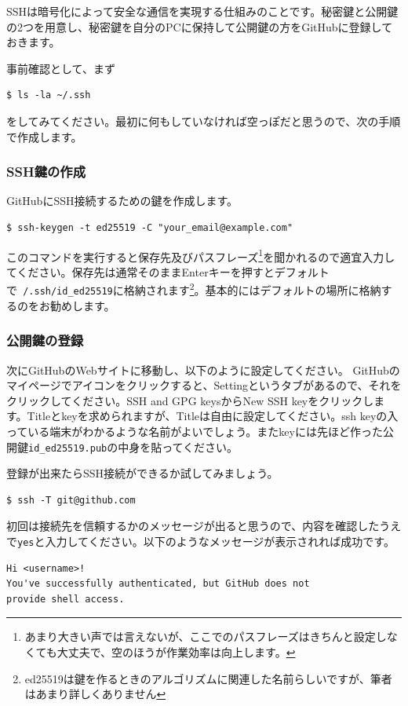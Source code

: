 \documentclass[12pt]{jreport}
\begin{document}
SSHは暗号化によって安全な通信を実現する仕組みのことです。秘密鍵と公開鍵の2つを用意し、秘密鍵を自分のPCに保持して公開鍵の方をGitHubに登録しておきます。

事前確認として、まず
\begin{lstlisting}[style=terminal]
    $ ls -la ~/.ssh
\end{lstlisting}
をしてみてください。最初に何もしていなければ空っぽだと思うので、次の手順で作成します。

\subsubsection{SSH鍵の作成}
GitHubにSSH接続するための鍵を作成します。
\begin{lstlisting}[style=terminal]
    $ ssh-keygen -t ed25519 -C "your_email@example.com"
\end{lstlisting}
このコマンドを実行すると保存先及びパスフレーズ\footnote{あまり大きい声では言えないが、ここでのパスフレーズはきちんと設定しなくても大丈夫で、空のほうが作業効率は向上します。}を聞かれるので適宜入力してください。保存先は通常そのままEnterキーを押すとデフォルトで\texttt{~/.ssh/id_ed25519}に格納されます\footnote{ed25519は鍵を作るときのアルゴリズムに関連した名前らしいですが、筆者はあまり詳しくありません}。基本的にはデフォルトの場所に格納するのをお勧めします。

\subsubsection{公開鍵の登録}
次にGitHubのWebサイトに移動し、以下のように設定してください。
GitHubのマイページでアイコンをクリックすると、Settingというタブがあるので、それをクリックしてください。SSH and GPG keysからNew SSH keyをクリックします。Titleとkeyを求められますが、Titleは自由に設定してください。ssh keyの入っている端末がわかるような名前がよいでしょう。またkeyには先ほど作った公開鍵\texttt{id_ed25519.pub}の中身を貼ってください。

登録が出来たらSSH接続ができるか試してみましょう。
\begin{lstlisting}[style=terminal]
    $ ssh -T git@github.com
\end{lstlisting}
初回は接続先を信頼するかのメッセージが出ると思うので、内容を確認したうえで\texttt{yes}と入力してください。以下のようなメッセージが表示されれば成功です。

\begin{lstlisting}[style=terminal]
Hi <username>!
You've successfully authenticated, but GitHub does not 
provide shell access.
\end{lstlisting}
\end{document}
